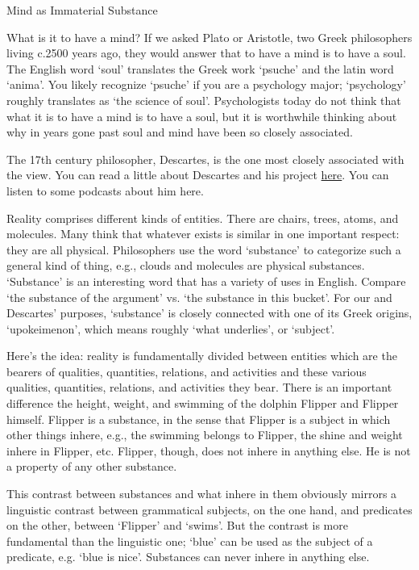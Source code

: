 \documentclass[]{article}
\date{}
\begin{document}
Mind as Immaterial Substance

What is it to have a mind? If we asked Plato or Aristotle, two Greek
philosophers living c.2500 years ago, they would answer that to have a
mind is to have a soul. The English word `soul' translates the Greek
work `psuche' and the latin word `anima'. You likely recognize `psuche'
if you are a psychology major; `psychology' roughly translates as `the
science of soul'. Psychologists today do not think that what it is to
have a mind is to have a soul, but it is worthwhile thinking about why
in years gone past soul and mind have been so closely associated.

The 17th century philosopher, Descartes, is the one most closely
associated with the view. You can read a little about Descartes and his
project \href{Descartes}{here}. You can listen to some podcasts about
him here.

Reality comprises different kinds of entities. There are chairs, trees,
atoms, and molecules. Many think that whatever exists is similar in one
important respect: they are all physical. Philosophers use the word
`substance' to categorize such a general kind of thing, e.g., clouds and
molecules are physical substances. `Substance' is an interesting word
that has a variety of uses in English. Compare `the substance of the
argument' vs. `the substance in this bucket'. For our and Descartes'
purposes, `substance' is closely connected with one of its Greek
origins, `upokeimenon', which means roughly `what underlies', or
`subject'.

Here's the idea: reality is fundamentally divided between entities which
are the bearers of qualities, quantities, relations, and activities and
these various qualities, quantities, relations, and activities they
bear. There is an important difference the height, weight, and swimming
of the dolphin Flipper and Flipper himself. Flipper is a substance, in
the sense that Flipper is a subject in which other things inhere, e.g.,
the swimming belongs to Flipper, the shine and weight inhere in Flipper,
etc. Flipper, though, does not inhere in anything else. He is not a
property of any other substance.

This contrast between substances and what inhere in them obviously
mirrors a linguistic contrast between grammatical subjects, on the one
hand, and predicates on the other, between `Flipper' and `swims'. But
the contrast is more fundamental than the linguistic one; `blue' can be
used as the subject of a predicate, e.g. `blue is nice'. Substances can
never inhere in anything else.
\end{document}

